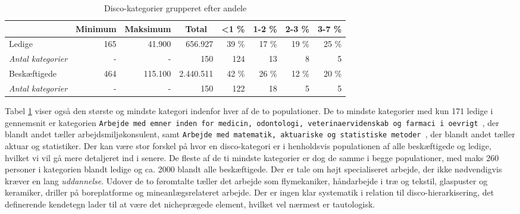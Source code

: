 \begin{table}[ht]
\centering
\caption{Disco-kategorier grupperet efter andele}
\label{tab_discokat_grup}
\begin{tabular}{@{}lrrrrrrr@{}}
\toprule
\multicolumn{1}{c}{}      & \multicolumn{1}{c}{Minimum} & \multicolumn{1}{c}{Maksimum} & \multicolumn{1}{c}{Total} & \multicolumn{1}{c}{\textless 1 \%} & \multicolumn{1}{c}{1-2 \%} & \multicolumn{1}{c}{2-3 \%} & \multicolumn{1}{c}{3-7 \%} \\ \midrule
Ledige                    & 165                         & 41.900                       & 656.927                   & 39 \%                              & 17 \%                      & 19 \%                      & 25 \%                      \\
\textit{Antal kategorier} & -                           & -                            & 150                       & 124                                & 13                         & 8                          & 5                          \\
Beskæftigede              & 464                         & 115.100                      & 2.440.511                 & 42 \%                              & 26 \%                      & 12 \%                      & 20 \%                      \\
\textit{Antal kategorier} & -                           & -                            & 150                       & 122                                & 18                         & 5                          & 5                          \\ \bottomrule
\end{tabular}
\end{table}

Tabel \ref{tab_discokat_grup} viser også den største og mindste kategori indenfor hver af de to populationer. De to mindste kategorier med kun 171 ledige i gennemsnit er kategorien \texttt{Arbejde med emner inden for medicin, odontologi, veterinaervidenskab og farmaci i oevrigt
}, der blandt andet tæller arbejdsmiljøkonsulent, samt \texttt{Arbejde med matematik, aktuariske og statistiske metoder
}, der blandt andet tæller aktuar og statistiker. Der kan være stor forskel på hvor en disco-kategori er i henholdsvis populationen af alle beskæftigede og ledige, hvilket vi vil gå mere detaljeret ind i senere. De fleste af de ti mindste kategorier er dog de samme i begge populationer, med maks 260 personer i kategorien blandt ledige og ca. 2000 blandt alle  beskæftigede. Der er tale om højt specialiseret arbejde, der ikke nødvendigvis kræver en lang \emph{uddannelse}. Udover de to føromtalte tæller det arbejde som flymekaniker, håndarbejde i træ og tekstil, glaspuster og keramiker, driller på boreplatforme og mineanlægsrelateret arbejde. Der er ingen klar systematik i relation til disco-hierarkisering, det definerende kendetegn lader til at være det nicheprægede element, hvilket vel nærmest er tautologisk. 

